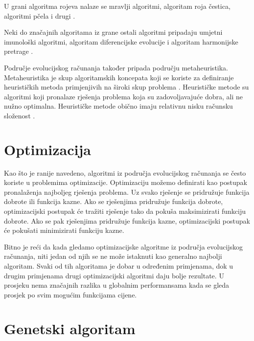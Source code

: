 \documentclass[zavrsnirad]{fer}
\begin{document}
	U grani algoritma rojeva nalaze se mravlji algoritmi, algoritam roja čestica, algoritmi pčela i drugi \cite{skriptaEvolucijskoRacunarstvo}.
	
	Neki do značajnih algoritama iz grane ostali algoritmi pripadaju umjetni imunološki algoritmi, algoritam diferencijske evolucije i algoritam harmonijske pretrage \cite{skriptaEvolucijskoRacunarstvo}.
	
	Područje evolucijskog računanja također pripada području metaheuristika. Metaheuristika je skup algoritamskih koncepata koji se koriste za definiranje heurističkih metoda primjenjivih na široki skup problema \cite{skriptaEvolucijskoRacunarstvo}. Heurističke metode su algoritmi koji pronalaze rješenja problema koja su zadovoljavajuće dobra, ali ne nužno optimalna. Heurističke metode obično imaju relativnu nisku računsku složenost \cite{skriptaEvolucijskoRacunarstvo}.

	\section{Optimizacija}
	
		Kao što je ranije navedeno, algoritmi iz područja evolucijskog računanja se često koriste u problemima optimizacije. Optimizaciju možemo definirati kao postupak pronalaženja najboljeg rješenja problema. Uz svako rješenje se pridružuje funkcija dobrote ili funkcija kazne. Ako se rješenjima pridružuje funkcija dobrote, optimizacijski postupak će tražiti rješenje tako da pokuša maksimizirati funkciju dobrote. Ako se pak rješenjima pridružuje funkcija kazne, optimizacijski postupak će pokušati minimizirati funkciju kazne.\cite{skriptaEvolucijskoRacunarstvo}

		Bitno je reći da kada gledamo optimizacijske algoritme iz područja evolucijskog računanja, niti jedan od njih se ne može istaknuti kao generalno najbolji algoritam. Svaki od tih algoritama je dobar u određenim primjenama, dok u drugim primjenama drugi optimizacijski algoritmi daju bolje rezultate. U prosjeku nema značajnih razlika u globalnim performansama kada se gleda prosjek po svim mogućim funkcijama cijene.\cite{skriptaEvolucijskoRacunarstvo}
	
	\section{Genetski algoritam}
	
\end{document}
